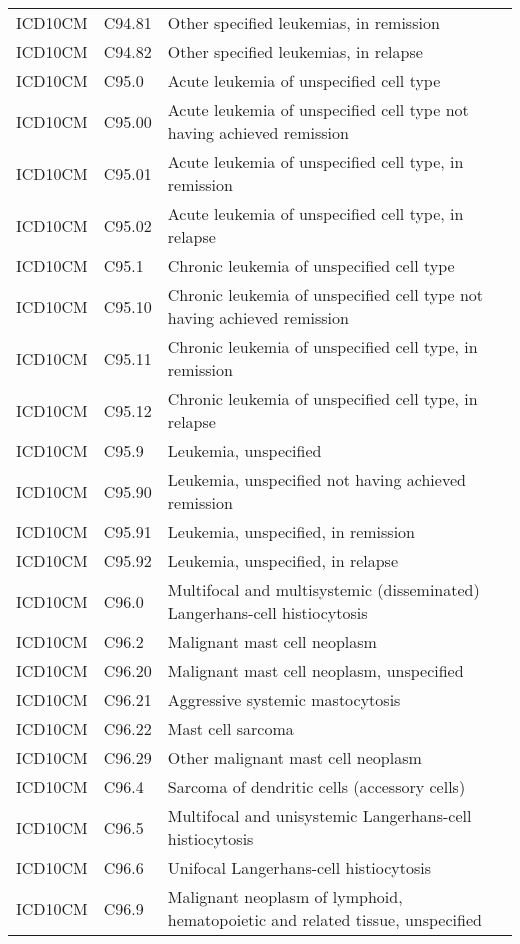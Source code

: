 \begin{longtable}{p{}p{}p{}}
  ICD10CM & C94.81 & Other specified leukemias, in remission \\ 
  ICD10CM & C94.82 & Other specified leukemias, in relapse \\ 
  ICD10CM & C95.0 & Acute leukemia of unspecified cell type \\ 
  ICD10CM & C95.00 & Acute leukemia of unspecified cell type not having achieved remission \\ 
  ICD10CM & C95.01 & Acute leukemia of unspecified cell type, in remission \\ 
  ICD10CM & C95.02 & Acute leukemia of unspecified cell type, in relapse \\ 
  ICD10CM & C95.1 & Chronic leukemia of unspecified cell type \\ 
  ICD10CM & C95.10 & Chronic leukemia of unspecified cell type not having achieved remission \\ 
  ICD10CM & C95.11 & Chronic leukemia of unspecified cell type, in remission \\ 
  ICD10CM & C95.12 & Chronic leukemia of unspecified cell type, in relapse \\ 
  ICD10CM & C95.9 & Leukemia, unspecified \\ 
  ICD10CM & C95.90 & Leukemia, unspecified not having achieved remission \\ 
  ICD10CM & C95.91 & Leukemia, unspecified, in remission \\ 
  ICD10CM & C95.92 & Leukemia, unspecified, in relapse \\ 
  ICD10CM & C96.0 & Multifocal and multisystemic (disseminated) Langerhans-cell histiocytosis \\ 
  ICD10CM & C96.2 & Malignant mast cell neoplasm \\ 
  ICD10CM & C96.20 & Malignant mast cell neoplasm, unspecified \\ 
  ICD10CM & C96.21 & Aggressive systemic mastocytosis \\ 
  ICD10CM & C96.22 & Mast cell sarcoma \\ 
  ICD10CM & C96.29 & Other malignant mast cell neoplasm \\ 
  ICD10CM & C96.4 & Sarcoma of dendritic cells (accessory cells) \\ 
  ICD10CM & C96.5 & Multifocal and unisystemic Langerhans-cell histiocytosis \\ 
  ICD10CM & C96.6 & Unifocal Langerhans-cell histiocytosis \\ 
  ICD10CM & C96.9 & Malignant neoplasm of lymphoid, hematopoietic and related tissue, unspecified \\ 

\end{longtable}
